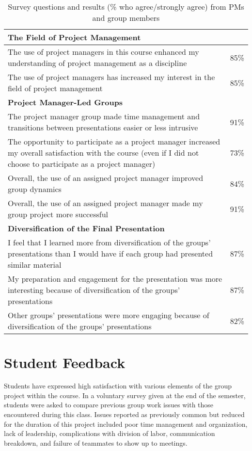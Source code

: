 \documentclass{sig-alternate}
\begin{document}
\begin{table*}[t]
\caption{Survey questions and results (\% who agree/strongly agree) from PMs and group members}
\label{table:satisfaction}
\begin{tabular}{|p{16.3cm}|c|} \hline
\textbf{The Field of Project Management}\cellcolor[gray]{0.9}&\cellcolor[gray]{0.9}\\ \hline
The use of project managers in this course enhanced my understanding of project
management as a discipline&85\%\\ \hline
The use of project managers has increased my interest in the field of project
management&85\%\\ \hline
\textbf{Project Manager-Led Groups}\cellcolor[gray]{0.9}&\cellcolor[gray]{0.9}\\ \hline
The project manager group made time management and transitions between
presentations easier or less intrusive&91\%\\ \hline
The opportunity to participate as a project manager increased my overall satisfaction with the course (even if I did not choose to participate as a project manager)&73\%\\ \hline
Overall, the use of an assigned project manager improved group dynamics&84\%\\ \hline
Overall, the use of an assigned project manager made my group project more successful&91\%\\ \hline
\textbf{Diversification of the Final Presentation}\cellcolor[gray]{0.9}&\cellcolor[gray]{0.9}\\ \hline
I feel that I learned more from diversification of the groups' presentations than I would have if each group had presented similar material&87\%\\ \hline
My preparation and engagement for the presentation was more interesting because of diversification of the groups' presentations&87\%\\ \hline
Other groups' presentations were more engaging because of diversification of the groups' presentations&82\%\\ \hline\end{tabular}
\end{table*}

\section{Student Feedback}
\label{sec:feedback}
Students have expressed high satisfaction with various elements of the group project within the
course. In a voluntary survey given at the end of the semester, students were asked to compare previous
group work issues with those encountered during this class. Issues reported as previously common but
reduced for the duration of this project included poor time management and organization, lack of
leadership, complications with division of labor, communication breakdown, and failure of teammates to
show up to meetings.
\end{document}
